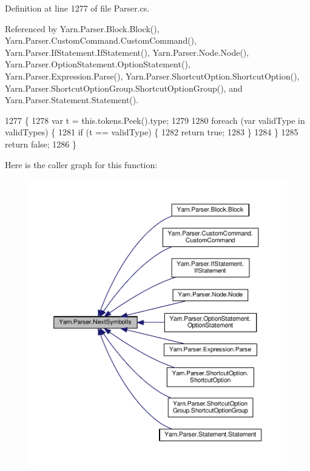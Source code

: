 Definition at line 1277 of file Parser.\-cs.



Referenced by Yarn.\-Parser.\-Block.\-Block(), Yarn.\-Parser.\-Custom\-Command.\-Custom\-Command(), Yarn.\-Parser.\-If\-Statement.\-If\-Statement(), Yarn.\-Parser.\-Node.\-Node(), Yarn.\-Parser.\-Option\-Statement.\-Option\-Statement(), Yarn.\-Parser.\-Expression.\-Parse(), Yarn.\-Parser.\-Shortcut\-Option.\-Shortcut\-Option(), Yarn.\-Parser.\-Shortcut\-Option\-Group.\-Shortcut\-Option\-Group(), and Yarn.\-Parser.\-Statement.\-Statement().


\begin{DoxyCode}
1277                                                          \{
1278             var t = this.tokens.Peek().type;
1279 
1280             \textcolor{keywordflow}{foreach} (var validType \textcolor{keywordflow}{in} validTypes) \{
1281                 \textcolor{keywordflow}{if} (t == validType) \{
1282                     \textcolor{keywordflow}{return} \textcolor{keyword}{true};
1283                 \}
1284             \}
1285             \textcolor{keywordflow}{return} \textcolor{keyword}{false};
1286         \}
\end{DoxyCode}


Here is the caller graph for this function\-:
\nopagebreak
\begin{figure}[H]
\begin{center}
\leavevmode
\includegraphics[width=350pt]{a00151_a666a945da1a7845b02b92592fccac291_icgraph}
\end{center}
\end{figure}


